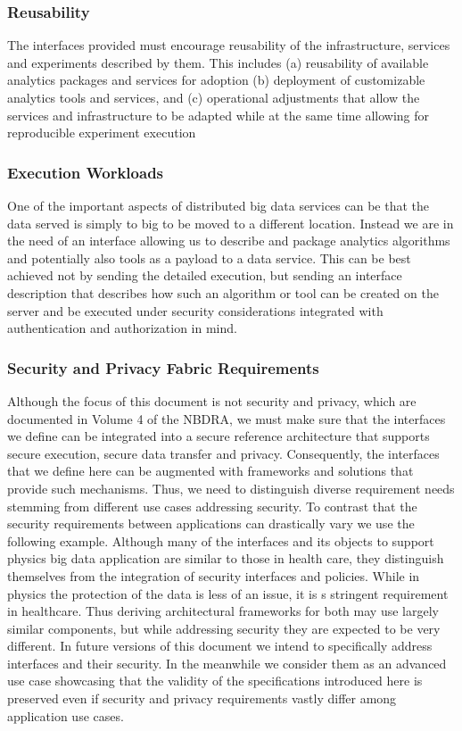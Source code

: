\documentclass[10pt]{article}
\begin{document}
\subsubsection{Reusability}

The interfaces provided must encourage reusability of the
infrastructure, services and experiments described by them. This
includes (a) reusability of available analytics packages and services
for adoption (b) deployment of customizable analytics tools and
services, and (c) operational adjustments that allow the services and
infrastructure to be adapted while at the same time allowing for
reproducible experiment execution

\subsubsection{Execution Workloads}

One of the important aspects of distributed big data services can be
that the data served is simply to big to be moved to a different
location. Instead we are in the need of an interface allowing us to
describe and package analytics algorithms and potentially also tools
as a payload to a data service. This can be best achieved not by
sending the detailed execution, but sending an interface description
that describes how such an algorithm or tool can be created on the
server and be executed under security considerations integrated
with authentication and authorization in mind.

\subsubsection{Security and Privacy Fabric Requirements}

Although the focus of this document is not security and privacy, which
are documented in Volume 4 \cite{nist-vol-4} of the NBDRA, we must
make sure that the interfaces we define can be integrated into a
secure reference architecture that supports secure execution, secure
data transfer and privacy. Consequently, the interfaces that we define
here can be augmented with frameworks and solutions that provide such
mechanisms. Thus, we need to distinguish diverse requirement needs
stemming from different use cases addressing security. To contrast
that the security requirements between applications can drastically
vary we use the following example. Although many of the interfaces and
its objects to support physics big data application are similar to
those in health care, they distinguish themselves from the integration
of security interfaces and policies. While in physics the protection
of the data is less of an issue, it is s stringent requirement in
healthcare. Thus deriving architectural frameworks for both may use
largely similar components, but while addressing security they are
expected to be very different. In future versions of this document we
intend to specifically address interfaces and their security. In the
meanwhile we consider them as an advanced use case showcasing that the
validity of the specifications introduced here is preserved even if
security and privacy requirements vastly differ among application use
cases.
\end{document}
